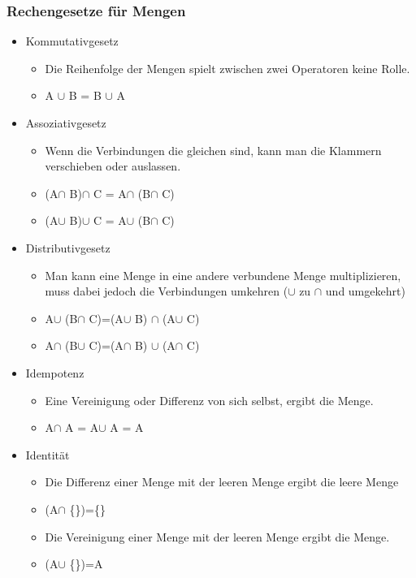 \documentclass{article}
\begin{document}
	\subsubsection{Rechengesetze für Mengen}
	\begin{itemize}
		\item{Kommutativgesetz}
		\begin{itemize}
			\item{Die Reihenfolge der Mengen spielt zwischen zwei Operatoren keine Rolle.}
			\item{A $\cup$ B = B $\cup$ A}
		\end{itemize}
		\item{Assoziativgesetz}
		\begin{itemize}
			\item{Wenn die Verbindungen die gleichen sind, kann man die Klammern verschieben oder auslassen.}
			\item{(A$\cap$ B)$\cap$ C = A$\cap$ (B$\cap$ C)}
			\item{(A$\cup$ B)$\cup$ C = A$\cup$ (B$\cap$ C)}
		\end{itemize}
		\item{Distributivgesetz}
		\begin{itemize}
			\item{Man kann eine Menge in eine andere verbundene Menge multiplizieren, muss dabei jedoch die Verbindungen umkehren ($\cup$ zu $\cap$ und umgekehrt)}
			\item{A$\cup$ (B$\cap$ C)=(A$\cup$ B) $\cap$ (A$\cup$ C)}
			\item{A$\cap$ (B$\cup$ C)=(A$\cap$ B) $\cup$ (A$\cap$ C)}
		\end{itemize}
		\item{Idempotenz}
		\begin{itemize}
			\item{Eine Vereinigung oder Differenz von sich selbst, ergibt die Menge.}
			\item{A$\cap$ A = A$\cup$ A = A}
		\end{itemize}
		\item{Identität}
		\begin{itemize}
			\item{Die Differenz einer Menge mit der leeren Menge ergibt die leere Menge}
			\item{(A$\cap$ \{\})=\{\}}
			\item{Die Vereinigung einer Menge mit der leeren Menge ergibt die Menge.}
			\item{(A$\cup$ \{\})=A}
		\end{itemize}

\end{itemize}
\end{document}
